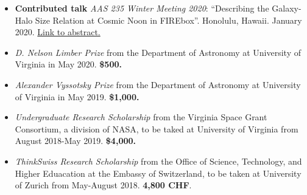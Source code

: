 \documentclass[a4paper,10pt,oneside]{article}
\begin{document}
\begin{itemize}[wide, labelwidth=!, labelindent=-11pt, parsep=0pt]
    \item {\bf Contributed talk} {\it AAS 235 Winter Meeting 2020}: ``Describing the Galaxy-Halo Size Relation at Cosmic Noon in FIREbox''. Honolulu, Hawaii. January 2020. \href{https://ui.adsabs.harvard.edu/abs/2020AAS...23526001R/abstract}{Link to abstract.}
\end{itemize}


\noindent{}

\begin{itemize}[wide, labelwidth=!, labelindent=-11pt, parsep=0pt]
    \item {\it D. Nelson Limber Prize} from the Department of Astronomy at University of Virginia in May 2020. {\bf \$500.}
    \item {\it Alexander Vyssotsky Prize} from the Department of Astronomy at University of Virginia in May 2019. {\bf \$1,000.}
    \item {\it Undergraduate Research Scholarship} from the Virginia Space Grant Consortium, a division of NASA, to be taked at University of Virginia from August 2018-May 2019. {\bf \$4,000.} 
    \item {\it ThinkSwiss Research Scholarship} from the Office of Science, Technology, and Higher Eduacation at the Embassy of Switzerland, to be taken at University of Zurich from May-August 2018. {\bf 4,800 CHF}.
\end{itemize}
\end{document}
